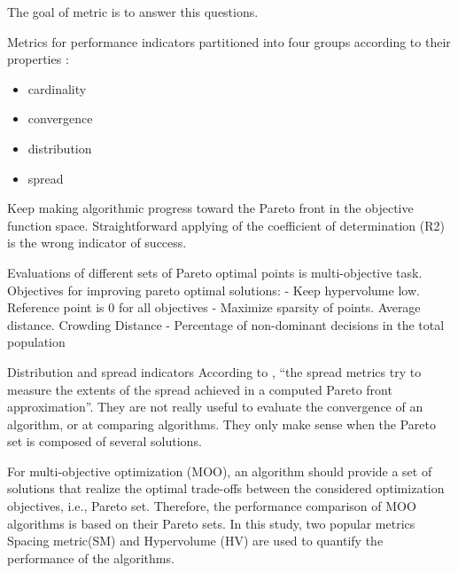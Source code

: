             The goal of metric is to answer this questions.  

            Metrics for performance indicators partitioned into four groups according to their properties \cite{Audet2018PerformanceII}: 
            \begin{itemize}
                \item cardinality
                \item convergence
                \item distribution
                \item spread
            \end{itemize}
        
            Keep making algorithmic progress toward the Pareto front in the objective function space.
            Straightforward applying of the coefficient of determination (R2) is the wrong indicator of success. 
        
            Evaluations of different sets of Pareto optimal points is multi-objective task.
            Objectives for improving pareto optimal solutions:
            - Keep hypervolume low. Reference point is 0 for all objectives
            - Maximize sparsity of points. Average distance. Crowding Distance
            - Percentage of non-dominant decisions in the total population
        
            Distribution and spread indicators According to \cite{CustodioMVV11}, “the spread metrics try to measure the extents of the spread achieved in a computed Pareto front approximation”. They are not really useful to evaluate the convergence of an algorithm, or at comparing algorithms. They only make sense when the Pareto set is composed of several solutions.
        
            For multi-objective optimization (MOO), an algorithm
            should provide a set of solutions that realize the optimal trade-offs between the considered optimization objectives, 
            i.e., Pareto set. Therefore, the performance comparison of MOO algorithms is based on their Pareto sets.
            In this study, two popular metrics Spacing metric(SM) and Hypervolume (HV) are used to quantify the performance of the algorithms. \cite{DBLP:journals/corr/abs-1812-07958}
           

